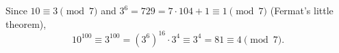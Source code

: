 Since $10\equiv3\pmod7$ and $3^6=729=7\cdot104+1\equiv1\pmod7$ (Fermat's little theorem),
\[10^{100}\equiv3^{100}=\left(3^6\right)^{16}\cdot3^4\equiv3^4=81\equiv\boxed{4}\pmod7.\]
